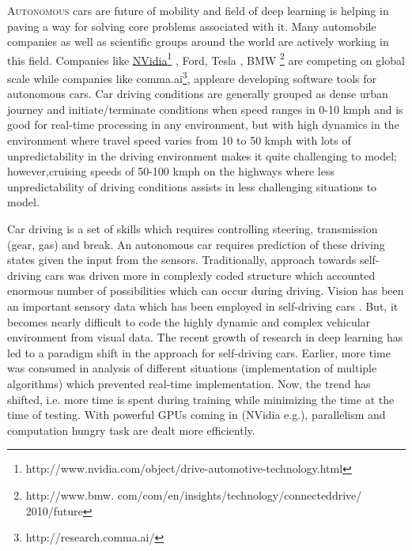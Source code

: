 \documentclass[a4paper,11pt,titlepage,drop]{article}%
\begin{document}
\lettrine{A}{utonomous} cars are future of mobility and field of deep learning \cite{deep} is helping in paving a way for solving core problems associated with it. Many automobile companies as well as scientific groups around the world are actively working in this field. Companies like \href{http://www.nvidia.com/object/drive-automotive-technology.html}{NVidia}\footnote{http://www.nvidia.com/object/drive-automotive-technology.html} \cite{nvidia}, Ford, Tesla \cite{tesla}, BMW \footnote{http://www.bmw. com/com/en/insights/technology/connecteddrive/ 2010/future} are competing on global scale while companies like comma.ai\footnote{http://research.comma.ai/}, appleare developing software tools for autonomous cars. Car driving conditions are generally grouped as dense urban journey and initiate/terminate conditions when speed ranges in 0-10 kmph and is good for real-time processing in any environment, but with high dynamics in the environment where  travel speed varies from 10 to 50 kmph with lots of unpredictability in the driving environment makes it quite challenging to model; however,cruising speeds of 50-100 kmph on the highways where less unpredictability of driving conditions assists in less challenging situations to model.

Car driving is a set of skills which requires controlling steering, transmission (gear, gas) and break. An autonomous car requires prediction of these driving states given the input from the sensors. Traditionally, approach towards self-driving cars was driven more in complexly coded structure which accounted enormous number of possibilities which can occur during driving. Vision has been an important sensory data which has been employed in self-driving cars \cite{stanford}. But, it becomes nearly difficult to code the highly dynamic and complex vehicular environment from visual data. The recent growth of research in deep learning has led to a paradigm shift in the approach for self-driving cars. Earlier, more time was consumed in analysis of different situations (implementation of multiple algorithms) which prevented real-time implementation. Now, the trend has shifted, i.e. more time is spent during training while minimizing the time at the time of testing. With powerful GPUs coming in (NVidia e.g.), parallelism and computation hungry task are dealt more efficiently.
\end{document}
